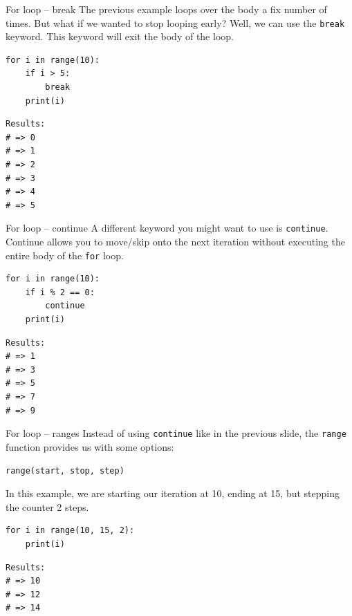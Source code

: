 \documentclass[10pt]{beamer}
\begin{document}
\begin{frame}[label={sec:orgaee3a86},fragile]{For loop -- break}
 The previous example loops over the body a fix number of times. But what if we wanted
to stop looping early? Well, we can use the \texttt{break} keyword. This keyword will exit the
body of the loop.

\begin{verbatim}
for i in range(10):
    if i > 5:
        break
    print(i)
\end{verbatim}

\begin{verbatim}
Results: 
# => 0
# => 1
# => 2
# => 3
# => 4
# => 5
\end{verbatim}
\end{frame}

\begin{frame}[label={sec:org2e4dcbe},fragile]{For loop -- continue}
 A different keyword you might want to use is \texttt{continue}. Continue allows you to move/skip
onto the next iteration without executing the entire body of the \texttt{for} loop.

\begin{verbatim}
for i in range(10):
    if i % 2 == 0:
        continue
    print(i)
\end{verbatim}

\begin{verbatim}
Results: 
# => 1
# => 3
# => 5
# => 7
# => 9
\end{verbatim}
\end{frame}

\begin{frame}[label={sec:org78a971d},fragile]{For loop -- ranges}
 Instead of using \texttt{continue} like in the previous slide, the \texttt{range} function provides us
with some options:

\texttt{range(start, stop, step)}

In this example, we are starting our iteration at 10, ending at 15, but stepping the
counter 2 steps.

\begin{verbatim}
for i in range(10, 15, 2):
    print(i)
\end{verbatim}

\begin{verbatim}
Results: 
# => 10
# => 12
# => 14
\end{verbatim}
\end{frame}
\end{document}
